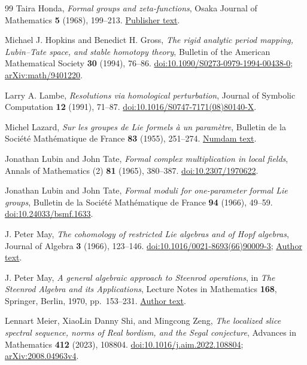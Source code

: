 \documentclass[11pt]{article}
\theoremstyle{definition}
\theoremstyle{remark}
\numberwithin{equation}{section}
\begin{document}
\begin{thebibliography}{99}
Taira Honda,
\emph{Formal groups and zeta-functions},
Osaka Journal of Mathematics \textbf{5} (1968), 199--213.
\href{https://ir.library.osaka-u.ac.jp/repo/ouka/all/8997/ojm05_02_05.pdf}{Publisher text}.

Michael J. Hopkins and Benedict H. Gross,
\emph{The rigid analytic period mapping, Lubin--Tate space, and stable homotopy theory},
Bulletin of the American Mathematical Society \textbf{30} (1994), 76--86.
\href{https://doi.org/10.1090/S0273-0979-1994-00438-0}{doi:10.1090/S0273-0979-1994-00438-0};
\href{https://arxiv.org/abs/math/9401220}{arXiv:math/9401220}.

Larry A. Lambe,
\emph{Resolutions via homological perturbation},
Journal of Symbolic Computation \textbf{12} (1991), 71--87.
\href{https://doi.org/10.1016/S0747-7171(08)80140-X}{doi:10.1016/S0747-7171(08)80140-X}.

Michel Lazard,
\emph{Sur les groupes de Lie formels \`a un param\`etre},
Bulletin de la Soci\'et\'e Math\'ematique de France \textbf{83} (1955), 251--274.
\href{https://www.numdam.org/article/BSMF_1955__83__251_0.pdf}{Numdam text}.

Jonathan Lubin and John Tate,
\emph{Formal complex multiplication in local fields},
Annals of Mathematics (2) \textbf{81} (1965), 380--387.
\href{https://doi.org/10.2307/1970622}{doi:10.2307/1970622}.

Jonathan Lubin and John Tate,
\emph{Formal moduli for one-parameter formal Lie groups},
Bulletin de la Soci\'et\'e Math\'ematique de France \textbf{94} (1966), 49--59.
\href{https://doi.org/10.24033/bsmf.1633}{doi:10.24033/bsmf.1633}.

J. Peter May,
\emph{The cohomology of restricted Lie algebras and of Hopf algebras},
Journal of Algebra \textbf{3} (1966), 123--146.
\href{https://doi.org/10.1016/0021-8693(66)90009-3}{doi:10.1016/0021-8693(66)90009-3};
\href{https://www.math.uchicago.edu/~may/PAPERS/3.pdf}{Author text}.

J. Peter May,
\emph{A general algebraic approach to Steenrod operations},
in \emph{The Steenrod Algebra and its Applications},
Lecture Notes in Mathematics \textbf{168}, Springer, Berlin, 1970, pp.~153--231.
\href{https://www.math.uchicago.edu/~may/PAPERS/10.pdf}{Author text}.

Lennart Meier, XiaoLin Danny Shi, and Mingcong Zeng,
\emph{The localized slice spectral sequence, norms of Real bordism,
and the Segal conjecture},
Advances in Mathematics \textbf{412} (2023), 108804.
\href{https://doi.org/10.1016/j.aim.2022.108804}{doi:10.1016/j.aim.2022.108804};
\href{https://arxiv.org/abs/2008.04963v4}{arXiv:2008.04963v4}.


\end{thebibliography}
\end{document}
